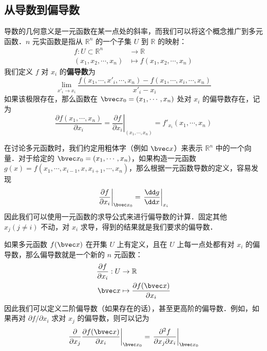 
\subsection{从导数到偏导数}
导数的几何意义是一元函数在某一点处的斜率，而我们可以将这个概念推广到多元函数．$n$ 元实函数是指从 $\mathbb{R} ^n$ 的一个子集 $U$ 到 $\mathbb{R}$ 的映射：
\begin{equation}
\begin{aligned}
f:U\subset \mathbb{R} ^n&\rightarrow \mathbb{R}\\
(x_1,x_2,\cdots,x_n)&\mapsto f(x_1,x_2,\cdots,x_n)
\end{aligned}
\end{equation}
我们定义 $f$ 对 $x_i$ 的\textbf{偏导数}为
\begin{equation}
\lim\limits_{x'_i\rightarrow x_{i}}\frac{f(x_1,\cdots,x'_i,\cdots,x_n)-f(x_1,\cdots,x_i,\cdots,x_n)}{x'_i-x_i}
\end{equation}
如果该极限存在，那么函数在 $\bvec x_0=(x_1,\cdots,x_n)$ 处对 $x_i$ 的偏导数存在，记为
\begin{equation}
\frac{\partial f(x_1,\cdots,x_n)}{\partial x_i}=\left.\frac{\partial f}{\partial x_i}\right|_{(x_1,\cdots,x_n)}=f'_{x_i}(x_1,\cdots,x_n)
\end{equation}

在讨论多元函数时，我们约定用粗体字（例如 $\bvec x$）来表示 $\mathbb{R}^n$ 中的一个向量．对于给定的 $\bvec x_0=(x_1,\cdots,x_n)$，如果构造一元函数 $g(x)=f(x_1,\cdots,x_{i-1},x,x_{i+1},\cdots,x_n)$，那么根据一元函数导数的定义，容易发现
\begin{equation}
\left.\frac{\partial f}{\partial x_i}\right|_{\bvec x_0}=\left.\frac{\dd g}{\dd x}\right|_{x_i}
\end{equation}
因此我们可以使用一元函数的求导公式来进行偏导数的计算．固定其他 $x_j(j\neq i)$ 不动，对 $x_i$ 求导，得到的结果就是我们要求的偏导数．

如果多元函数 $f(\bvec x)$ 在开集 $U$ 上有定义，且在 $U$ 上每一点处都有对 $x_i$ 的偏导数，那么偏导数就是一个新的 $n$ 元函数：
\begin{equation}
\begin{aligned}
\frac{\partial f}{\partial x_i}: U&\rightarrow \mathbb{R}\\
\bvec x&\mapsto \frac{\partial f(\bvec x)}{\partial x_i}
\end{aligned}
\end{equation}
因此我们可以定义二阶偏导数（如果存在的话），甚至更高阶的偏导数．例如，如果再对 $\partial f/\partial x_i$ 求对 $x_j$ 的偏导数，则可以记为
\begin{equation}
\left.\frac{\partial}{\partial x_j} \frac{\partial f(\bvec x)}{\partial x_i}\right|_{\bvec x_0}=\left.\frac{\partial^2 f}{\partial x_j\partial x_i }\right|_{\bvec x_0}
\end{equation}

